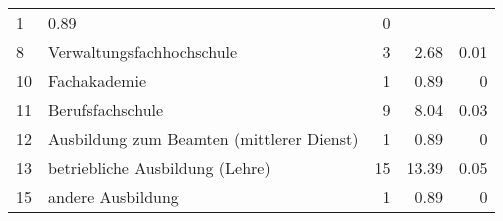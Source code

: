 \begin{longtable}{lXrrr}
       \num{1} &
       \num[round-mode=places,round-precision=2]{0.89} &
         \num[round-mode=places,round-precision=2]{0} \\

     8 &
     \multicolumn{1}{X}{ Verwaltungsfachhochschule   } &


       \num{3} &
       \num[round-mode=places,round-precision=2]{2.68} &
         \num[round-mode=places,round-precision=2]{0.01} \\

     10 &
     \multicolumn{1}{X}{ Fachakademie   } &


       \num{1} &
       \num[round-mode=places,round-precision=2]{0.89} &
         \num[round-mode=places,round-precision=2]{0} \\

     11 &
     \multicolumn{1}{X}{ Berufsfachschule   } &


       \num{9} &
       \num[round-mode=places,round-precision=2]{8.04} &
         \num[round-mode=places,round-precision=2]{0.03} \\

     12 &
     \multicolumn{1}{X}{ Ausbildung zum Beamten (mittlerer Dienst)   } &


       \num{1} &
       \num[round-mode=places,round-precision=2]{0.89} &
         \num[round-mode=places,round-precision=2]{0} \\

     13 &
     \multicolumn{1}{X}{ betriebliche Ausbildung (Lehre)   } &


       \num{15} &
       \num[round-mode=places,round-precision=2]{13.39} &
         \num[round-mode=places,round-precision=2]{0.05} \\

     15 &
     \multicolumn{1}{X}{ andere Ausbildung   } &


       \num{1} &
       \num[round-mode=places,round-precision=2]{0.89} &
         \num[round-mode=places,round-precision=2]{0} \\


\end{longtable}
